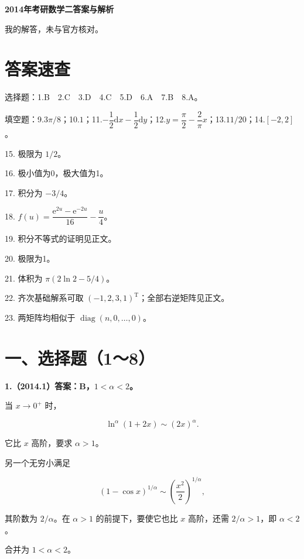 \documentclass[UTF8,11pt,fontset=windows]{ctexart}
\begin{document}
{\LARGE\bfseries 2014年考研数学二答案与解析\par}\vspace{6pt}

\begingroup\color{gray}我的解答，未与官方核对。\par\endgroup

\section*{答案速查}

\begingroup\color{gray}选择题：1.B　2.C　3.D　4.C　5.D　6.A　7.B　8.A。\par\endgroup

\begingroup\color{gray}填空题：9.$3\pi/8$；10.$1$；11.$-\dfrac12\mathrm dx-\dfrac12\mathrm dy$；12.$y=\dfrac\pi2-\dfrac2\pi x$；13.$11/20$；14.$[-2,2]$。\par\endgroup

15. 极限为 $1/2$。

16. 极小值为0，极大值为1。

17. 积分为 $-3/4$。

18. $f(u)=\dfrac{\mathrm e^{2u}-\mathrm e^{-2u}}{16}-\dfrac u4$。

19. 积分不等式的证明见正文。

20. 极限为1。

21. 体积为 $\pi(2\ln2-5/4)$。

22. 齐次基础解系可取 $(-1,2,3,1)^{\mathrm T}$；全部右逆矩阵见正文。

23. 两矩阵均相似于 $\operatorname{diag}(n,0,\ldots,0)$。

\clearpage

\section*{一、选择题（1～8）}

\textbf{1.（2014.1）答案：B，$1<\alpha<2$。}

当 $x\to0^+$ 时，

$$
\ln^\alpha(1+2x)\sim(2x)^\alpha.
$$

它比 $x$ 高阶，要求 $\alpha>1$。

另一个无穷小满足

$$
(1-\cos x)^{1/\alpha}\sim\left(\frac{x^2}{2}\right)^{1/\alpha},
$$

其阶数为 $2/\alpha$。在 $\alpha>1$ 的前提下，要使它也比 $x$ 高阶，还需 $2/\alpha>1$，即 $\alpha<2$。

合并为 $1<\alpha<2$。
\end{document}
